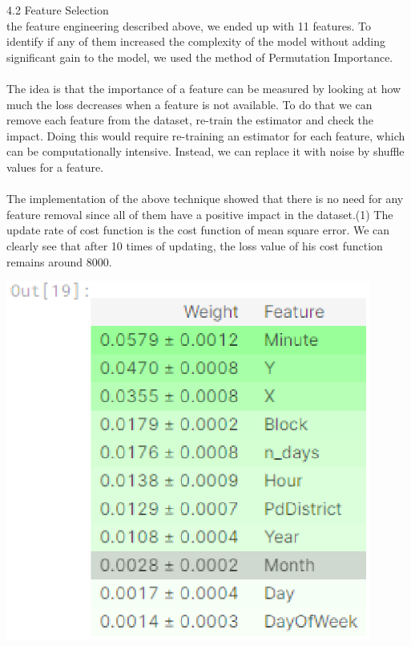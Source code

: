4.2 Feature Selection\\
\indent the feature engineering described above, we ended up with 11 features. 
To identify if any of them increased the complexity of the model without adding 
significant gain to the model, we used the method of Permutation Importance.\\
\\
\indent The idea is that the importance of a feature can be measured by looking 
at how much the loss decreases when a feature is not available. To do that
 we can remove each feature from the dataset, re-train the estimator and 
 check the impact. Doing this would require re-training an estimator for
  each feature, which can be computationally intensive. Instead, we can
replace it with noise by shuffle values for a feature.\\
\\
\indent The implementation of the above technique showed that there is no 
need for any feature removal since all of them have a positive impact 
in the dataset.(1) The update rate of cost function is the cost function
 of mean square error. We can clearly see that after 10 times of 
 updating, the loss value of his cost function remains around 8000.\\
\begin{center}

  \begin{minipage}{0.7\linewidth}
  \centering

  \includegraphics[width=0.9\textwidth]{kaggle/14.eps}
  
  \end{minipage}
\end{center}
